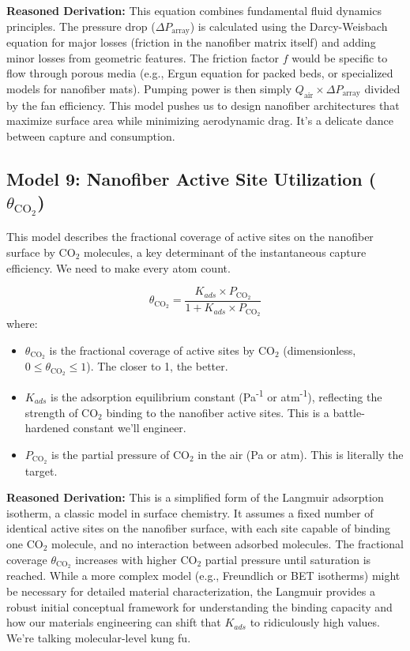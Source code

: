 \documentclass[12pt]{article}
\begin{document}
\textbf{Reasoned Derivation:} This equation combines fundamental fluid dynamics principles. The pressure drop (\(\Delta P_{\text{array}}\)) is calculated using the Darcy-Weisbach equation for major losses (friction in the nanofiber matrix itself) and adding minor losses from geometric features. The friction factor \(f\) would be specific to flow through porous media (e.g., Ergun equation for packed beds, or specialized models for nanofiber mats). Pumping power is then simply \(Q_{\text{air}} \times \Delta P_{\text{array}}\) divided by the fan efficiency. This model pushes us to design nanofiber architectures that maximize surface area while minimizing aerodynamic drag. It’s a delicate dance between capture and consumption.

\subsection*{Model 9: Nanofiber Active Site Utilization (\(\theta_{\text{CO}_2}\))}
This model describes the fractional coverage of active sites on the nanofiber surface by CO\(_2\) molecules, a key determinant of the instantaneous capture efficiency. We need to make every atom count.

\begin{equation}
\theta_{\text{CO}_2} = \frac{K_{ads} \times P_{\text{CO}_2}}{1 + K_{ads} \times P_{\text{CO}_2}}
\label{eq:langmuir}
\end{equation}
where:
\begin{itemize}
    \item \(\theta_{\text{CO}_2}\) is the fractional coverage of active sites by CO\(_2\) (dimensionless, \(0 \le \theta_{\text{CO}_2} \le 1\)). The closer to 1, the better.
    \item \(K_{ads}\) is the adsorption equilibrium constant (Pa\textsuperscript{-1} or atm\textsuperscript{-1}), reflecting the strength of CO\(_2\) binding to the nanofiber active sites. This is a battle-hardened constant we'll engineer.
    \item \(P_{\text{CO}_2}\) is the partial pressure of CO\(_2\) in the air (Pa or atm). This is literally the target.
\end{itemize}

\textbf{Reasoned Derivation:} This is a simplified form of the Langmuir adsorption isotherm, a classic model in surface chemistry. It assumes a fixed number of identical active sites on the nanofiber surface, with each site capable of binding one CO\(_2\) molecule, and no interaction between adsorbed molecules. The fractional coverage \(\theta_{\text{CO}_2}\) increases with higher CO\(_2\) partial pressure until saturation is reached. While a more complex model (e.g., Freundlich or BET isotherms) might be necessary for detailed material characterization, the Langmuir provides a robust initial conceptual framework for understanding the binding capacity and how our materials engineering can shift that \(K_{ads}\) to ridiculously high values. We're talking molecular-level kung fu.
\end{document}
